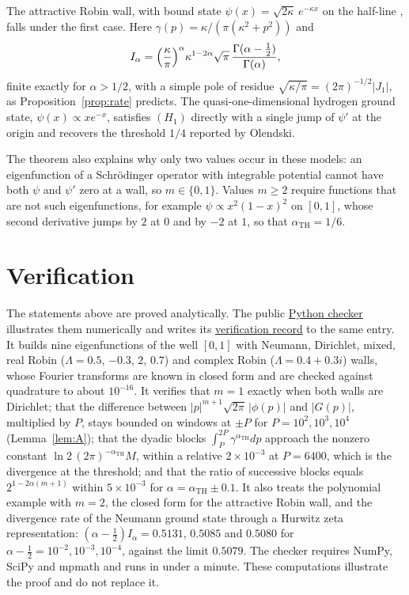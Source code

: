 \documentclass[11pt,a4paper]{article}
\theoremstyle{definition}
\theoremstyle{plain}
\newcommand{\aTH}{\alpha_{\mathrm{TH}}}
\begin{document}
The attractive Robin wall, with bound state $\psi(x)=\sqrt{2\kappa}\,e^{-\kappa x}$
on the half-line \cite{Olendski2019}, falls under the first case. Here
$\gamma(p)=\kappa/(\pi(\kappa^2+p^2))$ and
\[
I_\alpha=\Bigl(\frac\kappa\pi\Bigr)^\alpha\kappa^{1-2\alpha}\sqrt\pi\,
\frac{\Gamma(\alpha-\frac12)}{\Gamma(\alpha)},
\]
finite exactly for $\alpha>1/2$, with a simple pole of residue
$\sqrt{\kappa/\pi}=(2\pi)^{-1/2}|J_1|$, as Proposition~\ref{prop:rate}
predicts. The quasi-one-dimensional hydrogen ground state, $\psi(x)\propto
xe^{-x}$, satisfies $(H_1)$ directly with a single jump of $\psi'$ at the
origin and recovers the threshold $1/4$ reported by Olendski.

The theorem also explains why only two values occur in these models: an
eigenfunction of a Schr\"odinger operator with integrable potential cannot
have both $\psi$ and $\psi'$ zero at a wall, so $m\in\{0,1\}$. Values $m\ge2$
require functions that are not such eigenfunctions, for example
$\psi\propto x^2(1-x)^2$ on $[0,1]$, whose second derivative jumps by $2$ at
$0$ and by $-2$ at $1$, so that $\aTH=1/6$.

\section{Verification}\label{sec:verification}
The statements above are proved analytically. The public
\href{https://github.com/jpbruneton/open_quantum_problems/blob/main/research/entries/momentum-renyi-threshold/checks/check_momentum_threshold.py}{Python checker}
illustrates them numerically and writes its
\href{https://github.com/jpbruneton/open_quantum_problems/blob/main/research/entries/momentum-renyi-threshold/data/verification.json}{verification record}
to the same entry. It builds nine eigenfunctions of the well $[0,1]$ with
Neumann, Dirichlet, mixed, real Robin ($\Lambda=0.5$, $-0.3$, $2$, $0.7$) and
complex Robin ($\Lambda=0.4+0.3i$) walls, whose Fourier transforms are known
in closed form and are checked against quadrature to about $10^{-16}$. It
verifies that $m=1$ exactly when both walls are Dirichlet; that the difference
between $|p|^{m+1}\sqrt{2\pi}\,|\phi(p)|$ and $|G(p)|$, multiplied by $P$,
stays bounded on windows at $\pm P$ for $P=10^2,10^3,10^4$
(Lemma~\ref{lem:A}); that the dyadic blocks $\int_P^{2P}\gamma^{\aTH}dp$
approach the nonzero constant $\ln2\,(2\pi)^{-\aTH}M$, within a relative
$2\times10^{-3}$ at $P=6400$, which is the divergence at the threshold; and
that the ratio of successive blocks equals $2^{1-2\alpha(m+1)}$ within
$5\times10^{-3}$ for $\alpha=\aTH\pm0.1$. It also treats the polynomial example
with $m=2$, the closed form for the attractive Robin wall, and the divergence
rate of the Neumann ground state through a Hurwitz zeta representation:
$(\alpha-\frac12)I_\alpha=0.5131$, $0.5085$ and $0.5080$ for
$\alpha-\frac12=10^{-2},10^{-3},10^{-4}$, against the limit $0.5079$. The
checker requires NumPy, SciPy and mpmath and runs in under a minute. These
computations illustrate the proof and do not replace it.
\end{document}
